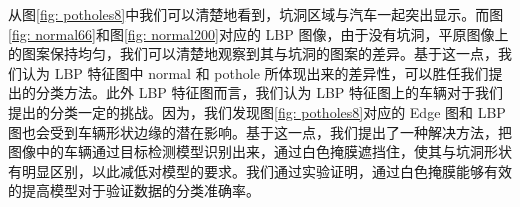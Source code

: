 \documentclass[a4paper, 10pt]{article}
\begin{document}
	从图\ref{fig: potholes8}中我们可以清楚地看到，坑洞区域与汽车一起突出显示。而图\ref{fig: normal66}和图\ref{fig: normal200}对应的 LBP 图像，由于没有坑洞，平原图像上的图案保持均匀，我们可以清楚地观察到其与坑洞的图案的差异。基于这一点，我们认为 LBP 特征图中 normal 和 pothole 所体现出来的差异性，可以胜任我们提出的分类方法。此外 LBP 特征图而言，我们认为 LBP 特征图上的车辆对于我们提出的分类一定的挑战。因为，我们发现图\ref{fig: potholes8}对应的 Edge 图和 LBP 图也会受到车辆形状边缘的潜在影响。基于这一点，我们提出了一种解决方法，把图像中的车辆通过目标检测模型识别出来，通过白色掩膜遮挡住，使其与坑洞形状有明显区别，以此减低对模型的要求。我们通过实验证明，通过白色掩膜能够有效的提高模型对于验证数据的分类准确率。
	
	
	\begin{figure}[htbp] 
		\centering 
		

\end{figure}
\end{document}
